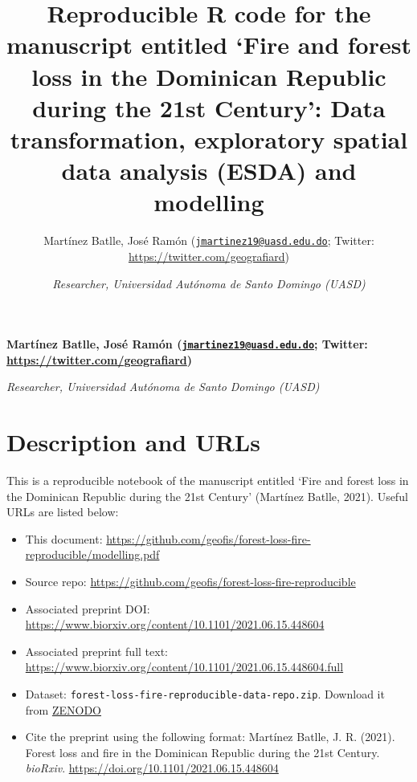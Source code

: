 \documentclass[10pt,landscape,a3paper]{article}
\title{Reproducible R code for the manuscript entitled `Fire and forest
loss in the Dominican Republic during the 21st Century': Data
transformation, exploratory spatial data analysis (ESDA) and
modelling  }
\author{\Large Martínez Batlle, José Ramón
(\href{mailto:jmartinez19@uasd.edu.do}{\nolinkurl{jmartinez19@uasd.edu.do}};
Twitter:
\url{https://twitter.com/geografiard})\vspace{0.05in} \newline\normalsize\emph{}   \and \Large \vspace{0.05in} \newline\normalsize\emph{Researcher,
Universidad Autónoma de Santo Domingo (UASD)}  }
\date{}
\newcommand*{\authorfont}{\fontfamily{phv}\selectfont}
\begin{document}
	
%    


{%
\setlength{\parindent}{0pt}
\thispagestyle{plain}
{\fontsize{18}{20}\selectfont\raggedright 
\maketitle  %

}

{
   \vskip 13.5pt\relax \normalsize\fontsize{11}{12} 
\textbf{\authorfont Martínez Batlle, José Ramón
(\href{mailto:jmartinez19@uasd.edu.do}{\nolinkurl{jmartinez19@uasd.edu.do}};
Twitter:
\url{https://twitter.com/geografiard})} \hskip 15pt \emph{\small }   \par \textbf{\authorfont } \hskip 15pt \emph{\small Researcher,
Universidad Autónoma de Santo Domingo (UASD)}   

}

}






\vskip 6.5pt

{
\hypersetup{linkcolor=black}
\setcounter{tocdepth}{4}
\tableofcontents
}

\noindent  \hypertarget{description-and-urls}{%
\section{Description and URLs}\label{description-and-urls}}

This is a reproducible notebook of the manuscript entitled `Fire and
forest loss in the Dominican Republic during the 21st Century' (Martínez
Batlle, 2021). Useful URLs are listed below:

\begin{itemize}
\item
  This document:
  \url{https://github.com/geofis/forest-loss-fire-reproducible/modelling.pdf}
\item
  Source repo:
  \url{https://github.com/geofis/forest-loss-fire-reproducible}
\item
  Associated preprint DOI:
  \url{https://www.biorxiv.org/content/10.1101/2021.06.15.448604}
\item
  Associated preprint full text:
  \url{https://www.biorxiv.org/content/10.1101/2021.06.15.448604.full}
\item
  Dataset: \texttt{forest-loss-fire-reproducible-data-repo.zip}.
  Download it from \href{https://zenodo.org/record/5681481}{ZENODO}
\item
  Cite the preprint using the following format: Martínez Batlle, J. R.
  (2021). Forest loss and fire in the Dominican Republic during the 21st
  Century. \emph{bioRxiv}.
  \url{https://doi.org/10.1101/2021.06.15.448604}
\end{itemize}
\end{document}
